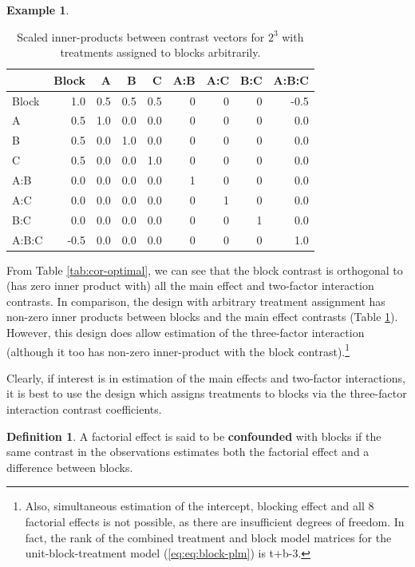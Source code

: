 \documentclass[
]{book}
\theoremstyle{definition}
\newtheorem{definition}{Definition}[chapter]
\theoremstyle{definition}
\newtheorem{example}{Example}[chapter]
\theoremstyle{definition}
\theoremstyle{definition}
\theoremstyle{remark}
\begin{document}
\begin{example}
\begin{table}
\caption{\label{tab:cor-partial}Scaled inner-products between contrast vectors for $2^3$ with treatments assigned to blocks arbitrarily.}
\centering
\begin{tabular}[t]{l|r|r|r|r|r|r|r|r}
\hline
  & Block & A & B & C & A:B & A:C & B:C & A:B:C\\
\hline
Block & 1.0 & 0.5 & 0.5 & 0.5 & 0 & 0 & 0 & -0.5\\
\hline
A & 0.5 & 1.0 & 0.0 & 0.0 & 0 & 0 & 0 & 0.0\\
\hline
B & 0.5 & 0.0 & 1.0 & 0.0 & 0 & 0 & 0 & 0.0\\
\hline
C & 0.5 & 0.0 & 0.0 & 1.0 & 0 & 0 & 0 & 0.0\\
\hline
A:B & 0.0 & 0.0 & 0.0 & 0.0 & 1 & 0 & 0 & 0.0\\
\hline
A:C & 0.0 & 0.0 & 0.0 & 0.0 & 0 & 1 & 0 & 0.0\\
\hline
B:C & 0.0 & 0.0 & 0.0 & 0.0 & 0 & 0 & 1 & 0.0\\
\hline
A:B:C & -0.5 & 0.0 & 0.0 & 0.0 & 0 & 0 & 0 & 1.0\\
\hline
\end{tabular}
\end{table}

From Table \ref{tab:cor-optimal}, we can see that the block contrast is orthogonal to (has zero inner product with) all the main effect and two-factor interaction contrasts. In comparison, the design with arbitrary treatment assignment has non-zero inner products between blocks and the main effect contrasts (Table \ref{tab:cor-partial}). However, this design does allow estimation of the three-factor interaction (although it too has non-zero inner-product with the block contrast).\footnote{Also, simultaneous estimation of the intercept, blocking effect and all 8 factorial effects is not possible, as there are insufficient degrees of freedom. In fact, the rank of the combined treatment and block model matrices for the unit-block-treatment model (\eqref{eq:eq:block-plm}) is t+b-3.}

Clearly, if interest is in estimation of the main effects and two-factor interactions, it is best to use the design which assigns treatments to blocks via the three-factor interaction contrast coefficients.
\end{example}

\begin{definition}
\protect\hypertarget{def:confounding}{}\label{def:confounding}A factorial effect is said to be \textbf{confounded} with blocks if the same contrast in the observations estimates both the factorial effect and a difference between blocks.
\end{definition}
\end{document}
